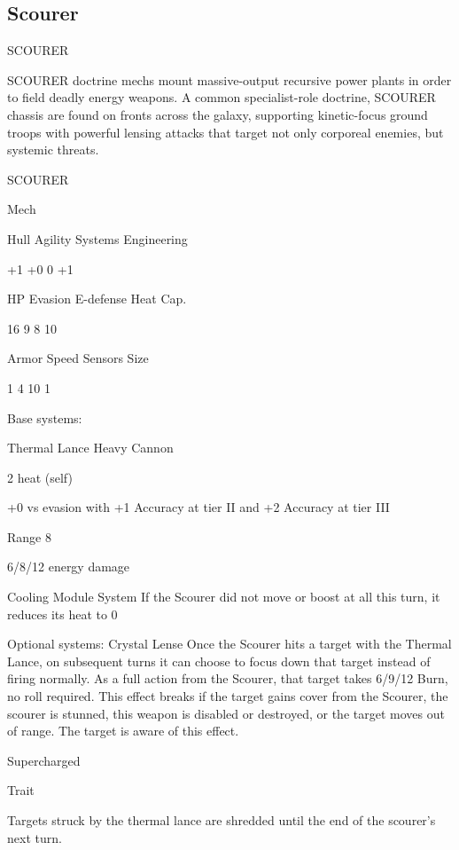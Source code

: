 \subsection{Scourer}

                                              SCOURER

SCOURER doctrine mechs mount massive-output recursive power plants in order to field deadly
energy weapons. A common specialist-role doctrine, SCOURER chassis are found on fronts
across the galaxy, supporting kinetic-focus ground troops with powerful lensing attacks that
target not only corporeal enemies, but systemic threats.


 SCOURER

 Mech

 Hull       Agility     Systems       Engineering

 +1         +0           0            +1

 HP         Evasion      E-defense    Heat Cap.

 16         9            8            10

 Armor      Speed       Sensors       Size

 1          4            10           1

Base systems:

Thermal Lance
Heavy Cannon

2 heat (self)

+0 vs evasion with +1 Accuracy at tier II and +2 Accuracy at tier III

Range 8

6/8/12 energy damage


Cooling Module
System
If the Scourer did not move or boost at all this turn, it reduces its heat to 0


Optional systems:
Crystal Lense
Once the Scourer hits a target with the Thermal Lance, on subsequent turns it can choose to
focus down that target instead of firing normally. As a full action from the Scourer, that target
takes 6/9/12 Burn, no roll required. This effect breaks if the target gains cover from the Scourer,
the scourer is stunned, this weapon is disabled or destroyed, or the target moves out of range.
The target is aware of this effect.


Supercharged

Trait





Targets struck by the thermal lance are shredded until the end of the scourer's next turn.


